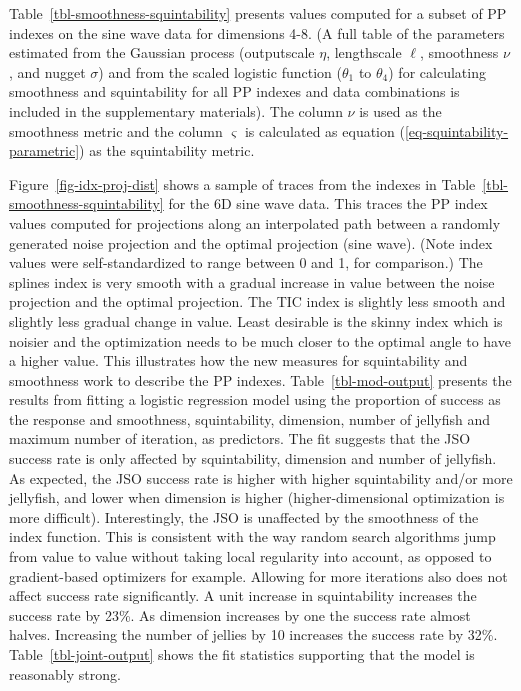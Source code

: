 \documentclass[
  12pt,
]{interact}
\theoremstyle{plain}
\begin{document}
\endgroup{}

Table~\ref{tbl-smoothness-squintability} presents values computed for a
subset of PP indexes on the sine wave data for dimensions 4-8. (A full
table of the parameters estimated from the Gaussian process (outputscale
\(\eta\), lengthscale \(\ell\), smoothness \(\nu\), and nugget
\(\sigma\)) and from the scaled logistic function (\(\theta_1\) to
\(\theta_4\)) for calculating smoothness and squintability for all PP
indexes and data combinations is included in the supplementary
materials). The column \(\nu\) is used as the smoothness metric and the
column \(\varsigma\) is calculated as equation
(\ref{eq-squintability-parametric}) as the squintability metric.

Figure~\ref{fig-idx-proj-dist} shows a sample of traces from the indexes
in Table~\ref{tbl-smoothness-squintability} for the 6D sine wave data.
This traces the PP index values computed for projections along an
interpolated path between a randomly generated noise projection and the
optimal projection (sine wave). (Note index values were
self-standardized to range between 0 and 1, for comparison.) The splines
index is very smooth with a gradual increase in value between the noise
projection and the optimal projection. The TIC index is slightly less
smooth and slightly less gradual change in value. Least desirable is the
skinny index which is noisier and the optimization needs to be much
closer to the optimal angle to have a higher value. This illustrates how
the new measures for squintability and smoothness work to describe the
PP indexes. Table~\ref{tbl-mod-output} presents the results from fitting
a logistic regression model using the proportion of success as the
response and smoothness, squintability, dimension, number of jellyfish
and maximum number of iteration, as predictors. The fit suggests that
the JSO success rate is only affected by squintability, dimension and
number of jellyfish. As expected, the JSO success rate is higher with
higher squintability and/or more jellyfish, and lower when dimension is
higher (higher-dimensional optimization is more difficult).
Interestingly, the JSO is unaffected by the smoothness of the index
function. This is consistent with the way random search algorithms jump
from value to value without taking local regularity into account, as
opposed to gradient-based optimizers for example. Allowing for more
iterations also does not affect success rate significantly. A unit
increase in squintability increases the success rate by 23\%. As
dimension increases by one the success rate almost halves. Increasing
the number of jellies by 10 increases the success rate by 32\%.
Table~\ref{tbl-joint-output} shows the fit statistics supporting that
the model is reasonably strong.
\end{document}
